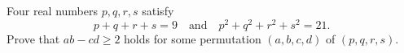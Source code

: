 Four real numbers $p, q, r, s$ satisfy
\[ p + q + r + s = 9 \quad \text{and} \quad p^2 + q^2 + r^2 + s^2 = 21. \]
Prove that $ab - cd \geq 2$ holds for some permutation $(a, b, c, d)$ of $(p, q, r, s)$.
